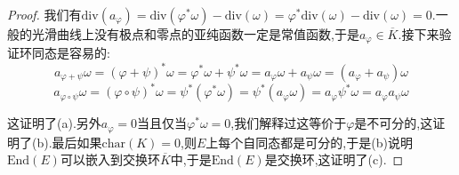 \begin{enumerate}
\begin{proof}
		我们有$\mathrm{div}(a_{\varphi})=\mathrm{div}(\varphi^*\omega)-\mathrm{div}(\omega)=\varphi^*\mathrm{div}(\omega)-\mathrm{div}(\omega)=0$.一般的光滑曲线上没有极点和零点的亚纯函数一定是常值函数,于是$a_{\varphi}\in\overline{K}$.接下来验证环同态是容易的:
		$$a_{\varphi+\psi}\omega=(\varphi+\psi)^*\omega=\varphi^*\omega+\psi^*\omega=a_{\varphi}\omega+a_{\psi}\omega=(a_{\varphi}+a_{\psi})\omega$$
		$$a_{\varphi\circ\psi}\omega=(\varphi\circ\psi)^*\omega=\psi^*(\varphi^*\omega)=\psi^*(a_{\varphi}\omega)=a_{\varphi}\psi^*\omega=a_{\varphi}a_{\psi}\omega$$
		
		这证明了(a).另外$a_{\varphi}=0$当且仅当$\varphi^*\omega=0$,我们解释过这等价于$\varphi$是不可分的,这证明了(b).最后如果$\mathrm{char}(K)=0$,则$E$上每个自同态都是可分的,于是(b)说明$\mathrm{End}(E)$可以嵌入到交换环$\overline{K}$中,于是$\mathrm{End}(E)$是交换环,这证明了(c).
	\end{proof}
\end{enumerate}
